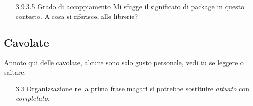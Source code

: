 \documentclass[11pt,a4paper]{article}
\begin{document}
\begin{itemize}
    \item [3.9.3.5 Grado di accoppiamento] Mi sfugge il significato di package in questo contesto. A cosa si riferisce, alle librerie?
  \end{itemize}

  \subsection{Cavolate}
  \label{sub:Cavolate}

  Annoto qui delle cavolate, alcune sono solo gusto personale, vedi tu se leggere o saltare.

  \begin{itemize}
    \item [3.3 Organizzazione] nella prima frase magari si potrebbe sostituire \textit{attuato} con \textit{completato}.
  \end{itemize}
\end{document}
